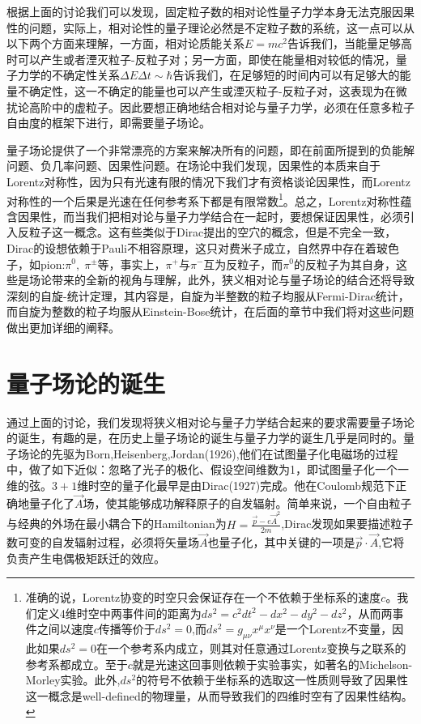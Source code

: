 根据上面的讨论我们可以发现，固定粒子数的相对论性量子力学本身无法克服因果性的问题，实际上，相对论性的量子理论必然是不定粒子数的系统，这一点可以从以下两个方面来理解，一方面，相对论质能关系$E=mc^{2}$告诉我们，当能量足够高时可以产生或者湮灭粒子-反粒子对；另一方面，即使在能量相对较低的情况，量子力学的不确定性关系$\Delta E \Delta t \sim \hbar$告诉我们，在足够短的时间内可以有足够大的能量不确定性，这一不确定的能量也可以产生或湮灭粒子-反粒子对，这表现为在微扰论高阶中的虚粒子。因此要想正确地结合相对论与量子力学，必须在任意多粒子自由度的框架下进行，即需要量子场论。

量子场论提供了一个非常漂亮的方案来解决所有的问题，即在前面所提到的负能解问题、负几率问题、因果性问题。在场论中我们发现，因果性的本质来自于Lorentz对称性，因为只有光速有限的情况下我们才有资格谈论因果性，而Lorentz对称性的一个后果是光速在任何参考系下都是有限常数\footnote{准确的说，Lorentz协变的时空只会保证存在一个不依赖于坐标系的速度$c$。我们定义4维时空中两事件间的距离为$ds^{2}=c^{2}dt^{2}-dx^{2}-dy^{2}-dz^{2}$，从而两事件之间以速度$c$传播等价于$ds^{2}=0$,而$ds^{2}=g_{\mu\nu}x^{\mu}x^{\nu}$是一个Lorentz不变量，因此如果$ds^{2}=0$在一个参考系内成立，则其对任意通过Lorentz变换与之联系的参考系都成立。至于$c$就是光速这回事则依赖于实验事实，如著名的Michelson-Morley实验。此外,$ds^{2}$的符号不依赖于坐标系的选取这一性质则导致了因果性这一概念是well-defined的物理量，从而导致我们的四维时空有了因果性结构。}。总之，Lorentz对称性蕴含因果性，而当我们把相对论与量子力学结合在一起时，要想保证因果性，必须引入反粒子这一概念。这有些类似于Dirac提出的空穴的概念，但是不完全一致，Dirac的设想依赖于Pauli不相容原理，这只对费米子成立，自然界中存在着玻色子，如pion:$\pi^{0},\;\pi^{\pm}$等，事实上，$\pi^{+}$与$\pi^{-}$互为反粒子，而$\pi^{0}$的反粒子为其自身，这些是场论带来的全新的视角与理解，此外，狭义相对论与量子场论的结合还将导致深刻的自旋-统计定理，其内容是，自旋为半整数的粒子均服从Fermi-Dirac统计，而自旋为整数的粒子均服从Einstein-Bose统计，在后面的章节中我们将对这些问题做出更加详细的阐释。

\section{量子场论的诞生}
通过上面的讨论，我们发现将狭义相对论与量子力学结合起来的要求需要量子场论的诞生，有趣的是，在历史上量子场论的诞生与量子力学的诞生几乎是同时的。量子场论的先驱为Born,Heisenberg,Jordan(1926),他们在试图量子化电磁场的过程中，做了如下近似：忽略了光子的极化、假设空间维数为1，即试图量子化一个一维的弦。$3+1$维时空的量子化最早是由Dirac(1927)完成。他在Coulomb规范下正确地量子化了$\vec{A}$场，使其能够成功解释原子的自发辐射。简单来说，一个自由粒子与经典的外场在最小耦合下的Hamiltonian为$H=\frac{\vec{p}-e\vec{A}^{2}}{2m}$,Dirac发现如果要描述粒子数可变的自发辐射过程，必须将矢量场$\vec{A}$也量子化，其中关键的一项是$\vec{p}\cdot \vec{A}$,它将负责产生电偶极矩跃迁的效应。

